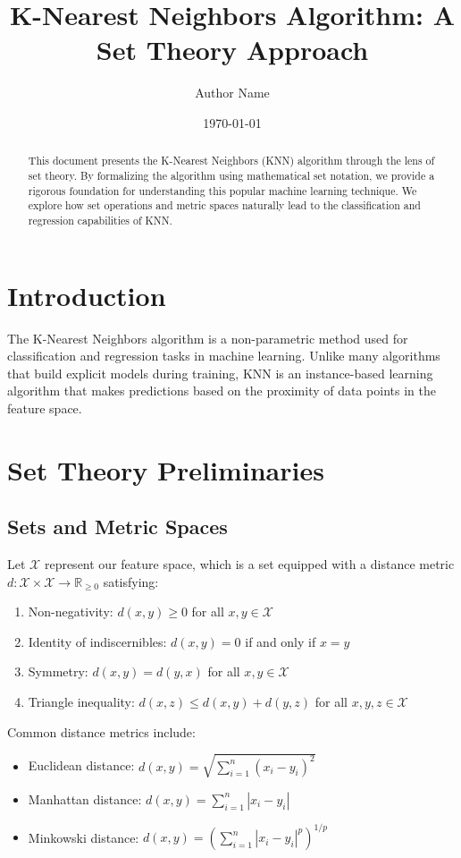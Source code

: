 \documentclass[12pt,a4paper]{article}
\title{K-Nearest Neighbors Algorithm: A Set Theory Approach}
\author{Author Name}
\date{\today}
\begin{document}
\maketitle

\begin{abstract}
This document presents the K-Nearest Neighbors (KNN) algorithm through the lens of set theory. By formalizing the algorithm using mathematical set notation, we provide a rigorous foundation for understanding this popular machine learning technique. We explore how set operations and metric spaces naturally lead to the classification and regression capabilities of KNN.
\end{abstract}

\section{Introduction}
The K-Nearest Neighbors algorithm is a non-parametric method used for classification and regression tasks in machine learning. Unlike many algorithms that build explicit models during training, KNN is an instance-based learning algorithm that makes predictions based on the proximity of data points in the feature space.

\section{Set Theory Preliminaries}

\subsection{Sets and Metric Spaces}
Let $\mathcal{X}$ represent our feature space, which is a set equipped with a distance metric $d: \mathcal{X} \times \mathcal{X} \rightarrow \mathbb{R}_{\geq 0}$ satisfying:
\begin{enumerate}
    \item Non-negativity: $d(x,y) \geq 0$ for all $x,y \in \mathcal{X}$
    \item Identity of indiscernibles: $d(x,y) = 0$ if and only if $x = y$
    \item Symmetry: $d(x,y) = d(y,x)$ for all $x,y \in \mathcal{X}$
    \item Triangle inequality: $d(x,z) \leq d(x,y) + d(y,z)$ for all $x,y,z \in \mathcal{X}$
\end{enumerate}

Common distance metrics include:
\begin{itemize}
    \item Euclidean distance: $d(x,y) = \sqrt{\sum_{i=1}^n (x_i - y_i)^2}$
    \item Manhattan distance: $d(x,y) = \sum_{i=1}^n |x_i - y_i|$
    \item Minkowski distance: $d(x,y) = \left(\sum_{i=1}^n |x_i - y_i|^p\right)^{1/p}$
\end{itemize}
\end{document}
